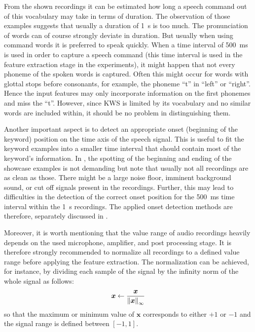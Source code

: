 \FloatBarrier
\noindent
From the shown recordings it can be estimated how long a speech command out of this vocabulary may take in terms of duration.
The observation of those examples suggests that usually a duration of \SI{1}{\second} is too much.
The pronunciation of words can of course strongly deviate in duration.
But usually when using command words it is preferred to speak quickly.
When a time interval of \SI{500}{\milli\second} is used in order to capture a speech command (this time interval is used in the feature extraction stage in the experiments), it might happen that not every phoneme of the spoken words is captured.
Often this might occur for words with glottal stops before consonants, for example, the phoneme \enquote{t} in \enquote{left} or \enquote{right}.
Hence the input features may only incorporate information on the first phonemes and miss the \enquote{t}.
However, since KWS is limited by its vocabulary and no similar words are included within, it should be no problem in distinguishing them.

Another important aspect is to detect an appropriate onset (beginning of the keyword) position on the time axis of the speech signal.
This is useful to fit the keyword examples into a smaller time interval that should contain most of the keyword's information.
In , the spotting of the beginning and ending of the showcase examples is not demanding but note that usually not all recordings are as clean as those.
There might be a large noise floor, imminent background sound, or cut off signals present in the recordings.
Further, this may lead to difficulties in the detection of the correct onset position for the \SI{500}{\milli\second} time interval within the \SI{1}{\second} recordings.
The applied onset detection methods are therefore, separately discussed in .

Moreover, it is worth mentioning that the value range of audio recordings heavily depends on the used microphone, amplifier, and post processing stage.
It is therefore strongly recommended to normalize all recordings to a defined value range before applying the feature extraction.
The normalization can be achieved, for instance, by dividing each sample of the signal by the infinity norm of the whole signal as follows:
\begin{equation}
  \bm{x} \gets \frac{\bm{x}}{\norm{\bm{x}}_\infty}
\end{equation}
so that the maximum or minimum value of $\bm{x}$ corresponds to either $+1$ or $-1$ and the signal range is defined between $[-1, 1]$.